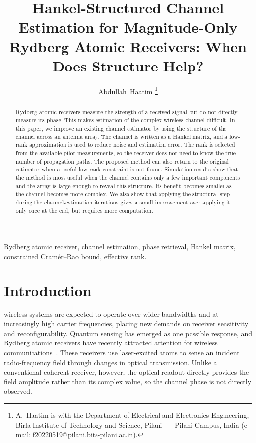 \documentclass[journal]{IEEEtran}
\begin{document}
\title{Hankel-Structured Channel Estimation for Magnitude-Only Rydberg Atomic Receivers: When Does Structure Help?}

\author{Abdullah~Haatim%
\thanks{A.~Haatim is with the Department of Electrical and Electronics
Engineering, Birla Institute of Technology and Science, Pilani~--- Pilani
Campus, India (e-mail: f20220519@pilani.bits-pilani.ac.in).}}

\maketitle

\begin{abstract}
Rydberg atomic receivers measure the strength of a received signal but do
not directly measure its phase. This makes estimation of the complex wireless
channel difficult. In this paper, we improve an existing channel estimator by
using the structure of the channel across an antenna array. The channel is
written as a Hankel matrix, and a low-rank approximation is used to reduce
noise and estimation error. The rank is selected from the available pilot
measurements, so the receiver does not need to know the true number of
propagation paths. The proposed method can also return to the original
estimator when a useful low-rank constraint is not found. Simulation results
show that the method is most useful when the channel contains only a few
important components and the array is large enough to reveal this structure.
Its benefit becomes smaller as the channel becomes more complex. We also show
that applying the structural step during the channel-estimation iterations
gives a small improvement over applying it only once at the end, but requires
more computation.
\end{abstract}

\begin{IEEEkeywords}
Rydberg atomic receiver, channel estimation, phase retrieval, Hankel matrix,
constrained Cram\'er--Rao bound, effective rank.
\end{IEEEkeywords}


\section{Introduction}

 wireless systems are expected to operate
over wider bandwidths and at increasingly high carrier frequencies, placing
new demands on receiver sensitivity and reconfigurability. Quantum sensing has
emerged as one possible response, and Rydberg atomic receivers have recently
attracted attention for wireless communications~\cite{cui2025,gong2025mag}.
These receivers use laser-excited atoms to sense an incident radio-frequency
field through changes in optical transmission. Unlike a conventional coherent
receiver, however, the optical readout directly provides the field amplitude
rather than its complex value, so the channel phase is not directly observed.
\end{document}
